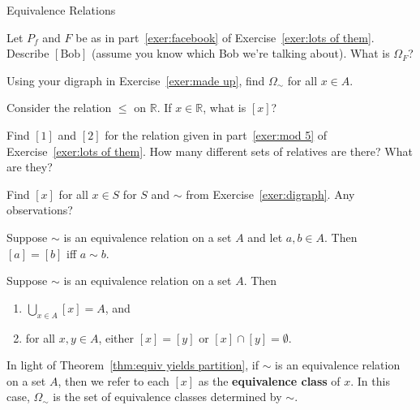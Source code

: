\begin{section}{Equivalence Relations}
\begin{exercise}
Let $P_f$ and $F$ be as in part~\ref{exer:facebook} of Exercise~\ref{exer:lots of them}.  Describe $[\text{Bob}]$ (assume you know which Bob we're talking about).  What is $\Omega_F$?
\end{exercise}

\begin{exercise}
Using your digraph in Exercise~\ref{exer:made up}, find $\Omega_{\sim}$ for all $x\in A$.  
\end{exercise}

\begin{exercise}
Consider the relation $\leq$ on $\mathbb{R}$.  If $x\in \mathbb{R}$, what is $[x]$?
\end{exercise}

\begin{exercise}
Find $[1]$ and $[2]$ for the relation given in part~\ref{exer:mod 5} of Exercise~\ref{exer:lots of them}.  How many different sets of relatives are there?  What are they?
\end{exercise}

\begin{exercise}
Find $[x]$ for all $x\in S$ for $S$ and $\sim$ from Exercise~\ref{exer:digraph}.  Any observations?
\end{exercise}

\begin{theorem}
Suppose $\sim$ is an equivalence relation on a set $A$ and let $a,b\in A$.  Then $[a]=[b]$ iff $a\sim b$.
\end{theorem}

\begin{theorem}\label{thm:equiv yields partition}
Suppose $\sim$ is an equivalence relation on a set $A$.  Then
\begin{enumerate}[label=\textrm{(\alph*)}]
\item $\bigcup_{x\in A}[x]=A$, and
\item for all $x,y\in A$, either $[x]=[y]$ or $[x]\cap [y]=\emptyset$.
\end{enumerate}
\end{theorem}

\begin{definition}
In light of Theorem~\ref{thm:equiv yields partition}, if $\sim$ is an equivalence relation on a set $A$, then we refer to each $[x]$ as the \textbf{equivalence class} of $x$.  In this case, $\Omega_{\sim}$ is the set of equivalence classes determined by $\sim$.
\end{definition}


\end{section}
